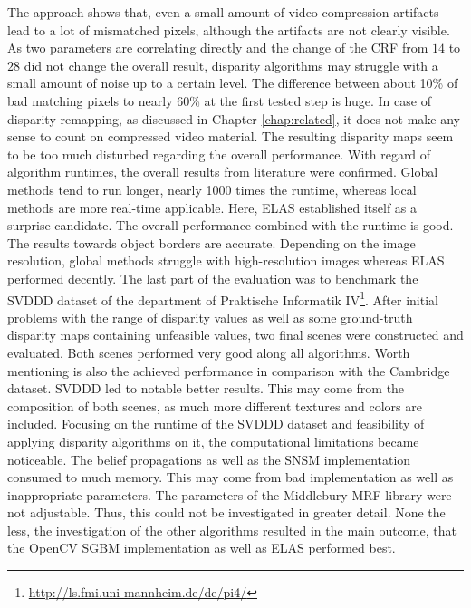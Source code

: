 The approach shows that, even a small amount of video compression artifacts lead to a lot of mismatched pixels, although the artifacts are not clearly visible.
As two parameters are correlating directly and the change of the CRF from $14$ to $28$ did not change the overall result, disparity algorithms may struggle with a small amount of noise up to a certain level.
The difference between about 10\% of bad matching pixels to nearly 60\% at the first tested step is huge.
In case of disparity remapping, as discussed in Chapter \ref{chap:related}, it does not make any sense to count on compressed video material.
The resulting disparity maps seem to be too much disturbed regarding the overall performance.
\newline\newline\noindent With regard of algorithm runtimes, the overall results from literature were confirmed.
Global methods tend to run longer, nearly 1000 times the runtime, whereas local methods are more real-time applicable.
Here, ELAS established itself as a surprise candidate.
The overall performance combined with the runtime is good.
The results towards object borders are accurate.
Depending on the image resolution, global methods struggle with high-resolution images whereas ELAS performed decently.
\newline\newline\noindent The last part of the evaluation was to benchmark the SVDDD dataset of the department of Praktische Informatik IV\footnote{\url{http://ls.fmi.uni-mannheim.de/de/pi4/}}.
After initial problems with the range of disparity values as well as some ground-truth disparity maps containing unfeasible values, two final scenes were constructed and evaluated.
Both scenes performed very good along all algorithms.
Worth mentioning is also the achieved performance in comparison with the Cambridge dataset.
SVDDD led to notable better results.
This may come from the composition of both scenes, as much more different textures and colors are included.
Focusing on the runtime of the SVDDD dataset and feasibility of applying disparity algorithms on it, the computational limitations became noticeable.
The belief propagations as well as the SNSM implementation consumed to much memory.
This may come from bad implementation as well as inappropriate parameters.
The parameters of the Middlebury MRF library were not adjustable.
Thus, this could not be investigated in greater detail.
None the less, the investigation of the other algorithms resulted in the main outcome, that the OpenCV SGBM implementation as well as ELAS performed best.

